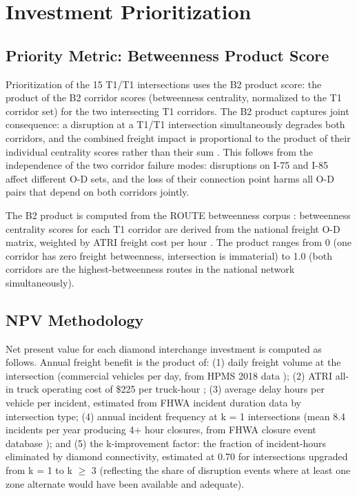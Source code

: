 \section{Investment Prioritization}
\label{sec:investment}

\subsection{Priority Metric: Betweenness Product Score}

Prioritization of the 15 T1/T1 intersections uses the B2 product score: the product of the B2 corridor scores (betweenness centrality, normalized to the T1 corridor set) for the two intersecting T1 corridors. The B2 product captures joint consequence: a disruption at a T1/T1 intersection simultaneously degrades both corridors, and the combined freight impact is proportional to the product of their individual centrality scores rather than their sum \citep{Jenelius2010}. This follows from the independence of the two corridor failure modes: disruptions on I-75 and I-85 affect different O-D sets, and the loss of their connection point harms all O-D pairs that depend on both corridors jointly.

The B2 product is computed from the ROUTE betweenness corpus \citep{ROUTE_B1, ROUTE_B3}: betweenness centrality scores for each T1 corridor are derived from the national freight O-D matrix, weighted by ATRI freight cost per hour \citep{ATRI_costs2024}. The product ranges from 0 (one corridor has zero freight betweenness, intersection is immaterial) to 1.0 (both corridors are the highest-betweenness routes in the national network simultaneously).

\subsection{NPV Methodology}

Net present value for each diamond interchange investment is computed as follows. Annual freight benefit is the product of: (1) daily freight volume at the intersection (commercial vehicles per day, from HPMS 2018 data \citep{FHWA_HPMS2023}); (2) ATRI all-in truck operating cost of \$225 per truck-hour \citep{ATRI_costs2024}; (3) average delay hours per vehicle per incident, estimated from FHWA incident duration data by intersection type; (4) annual incident frequency at k = 1 intersections (mean 8.4 incidents per year producing 4+ hour closures, from FHWA closure event database \citep{FHWA_freight2023}); and (5) the k-improvement factor: the fraction of incident-hours eliminated by diamond connectivity, estimated at 0.70 for intersections upgraded from k = 1 to k $\geq$ 3 (reflecting the share of disruption events where at least one zone alternate would have been available and adequate).

